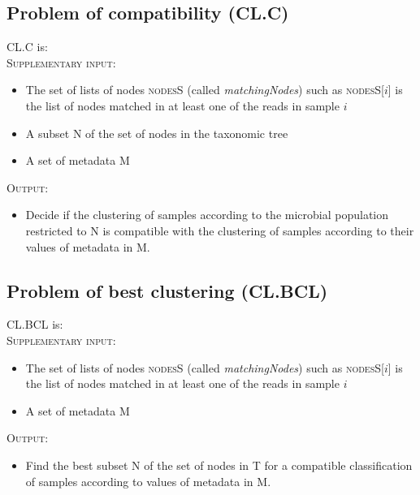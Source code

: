 \documentclass{report}
\begin{document}
\subsection{Problem of compatibility (CL.C)}
\textsc{CL.C} is:\\

\textsc{Supplementary input:} \begin{itemize}
                \item The set of lists of nodes \textsc{nodesS} (called \emph{matchingNodes}) such as \textsc{nodesS}[$i$] is the list of nodes matched in at least one of the reads in sample $i$
                \item A subset \textsc{N} of the set of nodes in the taxonomic tree
                \item A set of metadata \textsc{M}
                \end{itemize}

\bigskip

\textsc{Output:} \begin{itemize}
                 \item Decide if the clustering of samples according to the microbial population restricted to \textsc{N} is compatible with the clustering of samples according to their values of metadata in \textsc{M}.
                 \end{itemize}

\subsection{Problem of best clustering (CL.BCL)}
\textsc{CL.BCL} is:\\

\textsc{Supplementary input:} 
                \begin{itemize}
                \item The set of lists of nodes \textsc{nodesS} (called \emph{matchingNodes}) such as \textsc{nodesS}[$i$] is the list of nodes matched in at least one of the reads in sample $i$
                \item A set of metadata \textsc{M}
                \end{itemize}

\bigskip

\textsc{Output:} \begin{itemize}
                 \item Find the best subset \textsc{N} of the set of nodes in \textsc{T} for a compatible classification of samples according to values of metadata in \textsc{M}.
                 \end{itemize}
\end{document}
